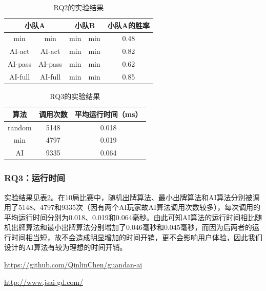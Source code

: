 \documentclass[a4paper]{ctexart}
\begin{document}
\begin{table}
	\centering 
	\caption{RQ2的实验结果}
	\label{RQ2_result}
	\begin{tabular}{|c|c|c|c|c|}
		\hline
		\multicolumn{2}{|c|}{小队A} & \multicolumn{2}{c|}{小队B} & 小队A的胜率 \\ \hline
		min        & min       & min      & min    & 0.48 \\ \hline
		AI-act        &    AI-act       & min         & min    &  0.82  \\ \hline
		AI-pass       & AI-pass           & min         & min  & 0.62     \\ \hline
		AI-full & AI-full & min & min & 0.85 \\ \hline
	\end{tabular}
\end{table}

\begin{table}
	\centering
	\caption{RQ3的实验结果}
	\label{RQ3_result}
	\begin{tabular}{|c|c|c|}
		\hline
		算法 & 调用次数 & 平均运行时间（ms） \\ \hline
		random & 5148 & 0.018  \\ \hline
		min & 4797 & 0.019 \\ \hline
		AI & 9335 & 0.064 \\ \hline
	\end{tabular}
\end{table}


\subsubsection{RQ3：运行时间}

实验结果见表\ref{RQ3_result}。在10局比赛中，随机出牌算法、最小出牌算法和AI算法分别被调用了5148、4797和9335次（因有两个AI玩家故AI算法调用次数较多），每次调用的平均运行时间分别为0.018、0.019和0.064毫秒。由此可知AI算法的运行时间相比随机出牌算法和最小出牌算法分别增加了0.046毫秒和0.045毫秒，而因为后两者的运行时间相当短，故不会造成明显增加的时间开销，更不会影响用户体验，因此我们设计的AI算法有较为理想的时间开销。

\begin{thebibliography}{99}
  \url{https://github.com/QinlinChen/guandan-ai}

  \url{http://www.jsai-gd.com/}
\end{thebibliography}
\end{document}
